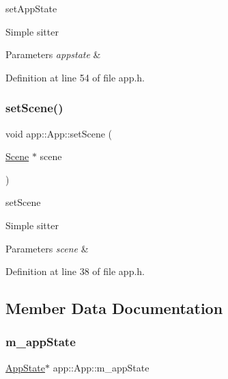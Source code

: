 set\+App\+State 

Simple sitter 
\begin{DoxyParams}{Parameters}
{\em appstate} & \\
\hline
\end{DoxyParams}


Definition at line 54 of file app.\+h.

\mbox{\label{classapp_1_1_app_a4ce3fa5bea946dbe89a6a451768a9dc4}} 
\subsubsection{\texorpdfstring{set\+Scene()}{setScene()}}
{\footnotesize\ttfamily void app\+::\+App\+::set\+Scene (\begin{DoxyParamCaption}\item[{\mbox{\hyperlink{class_scene}{Scene}} $\ast$}]{scene }\end{DoxyParamCaption})\hspace{0.3cm}{\ttfamily [inline]}}



set\+Scene 

Simple sitter 
\begin{DoxyParams}{Parameters}
{\em scene} & \\
\hline
\end{DoxyParams}


Definition at line 38 of file app.\+h.



\subsection{Member Data Documentation}
\mbox{\label{classapp_1_1_app_afab7fee5fb8023e0ebcb1dfeb04de85d}} 
\subsubsection{\texorpdfstring{m\+\_\+app\+State}{m\_appState}}
{\footnotesize\ttfamily \mbox{\hyperlink{classapp_1_1_app_state}{App\+State}}$\ast$ app\+::\+App\+::m\+\_\+app\+State\hspace{0.3cm}{\ttfamily [private]}}



